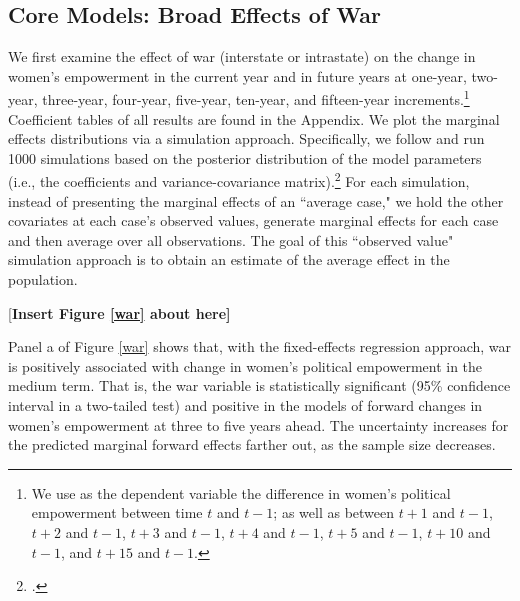 \documentclass [12pt] {article}
\begin{document}
\subsection*{Core Models: Broad Effects of War}
\vspace*{.2in}


We first examine the effect of war (interstate or intrastate) on the change in women's empowerment in the current year and in future years at one-year, two-year, three-year, four-year, five-year, ten-year, and fifteen-year increments.\footnote{We use as the dependent variable the difference in women's political empowerment between time $t$ and $t-1$; as well as between $t+1$ and $t-1$, $t+2$ and $t-1$, $t+3$ and $t-1$, $t+4$ and $t-1$, $t+5$ and $t-1$, $t+10$ and $t-1$, and $t+15$ and $t-1$.} Coefficient tables of all results are found in the Appendix. We plot the marginal effects distributions via a simulation approach. Specifically,  we follow  \citeauthor{hanmer2013behind} and run 1000 simulations based on the posterior distribution of the model parameters (i.e., the coefficients and variance-covariance matrix).\footnote{.} For each simulation, instead of presenting the marginal effects of an ``average case,"  we hold the other covariates at each case's observed values, generate marginal effects for each case and then average over all observations. The goal of this ``observed value" simulation approach is to obtain an estimate of the average effect in the population.\\

\begin{center}
[\bf Insert Figure \ref{war} about here]
\end{center}
\vspace*{.2in}

Panel a of Figure \ref{war} shows that, with the fixed-effects regression approach, war is positively associated with change in women's political empowerment in the medium term. That is, the war variable is statistically significant (95\% confidence interval in a two-tailed test) and positive in the models of forward changes in women's empowerment at three to five years ahead. The uncertainty increases for the predicted marginal forward effects farther out, as the sample size decreases. \\
\end{document}
